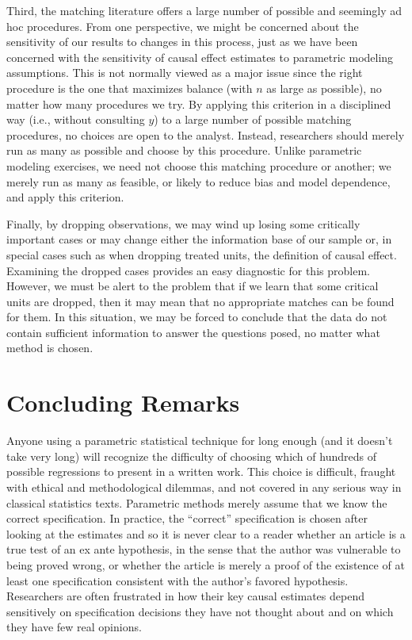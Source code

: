 \documentclass[11pt,titlepage]{article}
\begin{document}
Third, the matching literature offers a large number of possible and
seemingly ad hoc procedures.  From one perspective, we might be
concerned about the sensitivity of our results to changes in this
process, just as we have been concerned with the sensitivity of causal
effect estimates to parametric modeling assumptions.  This is not
normally viewed as a major issue since the right procedure is the one
that maximizes balance (with $n$ as large as possible), no matter how
many procedures we try.  By applying this criterion in a disciplined
way (i.e., without consulting $y$) to a large number of possible
matching procedures, no choices are open to the analyst.  Instead,
researchers should merely run as many as possible and choose by this
procedure.  Unlike parametric modeling exercises, we need not choose
this matching procedure or another; we merely run as many as feasible,
or likely to reduce bias and model dependence, and apply this
criterion.

Finally, by dropping observations, we may wind up losing some
critically important cases or may change either the information base
of our sample or, in special cases such as when dropping treated
units, the definition of causal effect.  Examining the dropped cases
provides an easy diagnostic for this problem.  However, we must be
alert to the problem that if we learn that some critical units are
dropped, then it may mean that no appropriate matches can be found for
them.  In this situation, we may be forced to conclude that the data
do not contain sufficient information to answer the questions posed,
no matter what method is chosen.

\section{Concluding Remarks}

Anyone using a parametric statistical technique for long enough (and
it doesn't take very long) will recognize the difficulty of choosing
which of hundreds of possible regressions to present in a written
work.  This choice is difficult, fraught with ethical and
methodological dilemmas, and not covered in any serious way in
classical statistics texts.  Parametric methods merely assume that we
know the correct specification.  In practice, the ``correct''
specification is chosen after looking at the estimates and so it is
never clear to a reader whether an article is a true test of an ex
ante hypothesis, in the sense that the author was vulnerable to being
proved wrong, or whether the article is merely a proof of the
existence of at least one specification consistent with the author's
favored hypothesis.  Researchers are often frustrated in how their key
causal estimates depend sensitively on specification decisions they
have not thought about and on which they have few real opinions.
\end{document}
